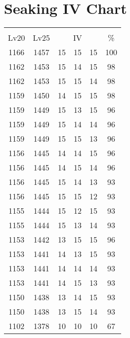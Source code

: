\documentclass{article}%
\begin{document}
%
\normalsize%
\section{Seaking IV Chart}%
\label{sec:Seaking IV Chart}%
\renewcommand{\arraystretch}{1.5}%
\begin{tabular}{|c|c|c|c|c|c|}%
\hline%
\multicolumn{6}{|c|}{\textcolor{white}{ 
\linebreak{Seaking}
}%
\cellcolor{black}}\\%
\multicolumn{1}{|c}{Lv20}&\multicolumn{1}{c|}{Lv25}&\multicolumn{3}{c|}{IV}&\multicolumn{1}{|c|}{\%}\\%
\hline%
\rowcolor{color100}%
1166&1457&15&15&15&100\\%
\hline%
\rowcolor{color98}%
1162&1453&15&14&15&98\\%
\hline%
\rowcolor{color98}%
1162&1453&15&15&14&98\\%
\hline%
\rowcolor{color98}%
1159&1450&14&15&15&98\\%
\hline%
\rowcolor{color96}%
1159&1449&15&13&15&96\\%
\hline%
\rowcolor{color96}%
1159&1449&15&14&14&96\\%
\hline%
\rowcolor{color96}%
1159&1449&15&15&13&96\\%
\hline%
\rowcolor{color96}%
1156&1445&14&14&15&96\\%
\hline%
\rowcolor{color96}%
1156&1445&14&15&14&96\\%
\hline%
\rowcolor{color93}%
1156&1445&15&14&13&93\\%
\hline%
\rowcolor{color93}%
1156&1445&15&15&12&93\\%
\hline%
\rowcolor{color93}%
1155&1444&15&12&15&93\\%
\hline%
\rowcolor{color93}%
1155&1444&15&13&14&93\\%
\hline%
\rowcolor{color96}%
1153&1442&13&15&15&96\\%
\hline%
\rowcolor{color93}%
1153&1441&14&13&15&93\\%
\hline%
\rowcolor{color93}%
1153&1441&14&14&14&93\\%
\hline%
\rowcolor{color93}%
1153&1441&14&15&13&93\\%
\hline%
\rowcolor{color93}%
1150&1438&13&14&15&93\\%
\hline%
\rowcolor{color93}%
1150&1438&13&15&14&93\\%
\hline%
\rowcolor{color91}%
1102&1378&10&10&10&67\\%
\end{tabular}

%
\end{document}
